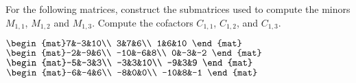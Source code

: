 
\begin{Exercise}[
name={},
title={}, 
difficulty=0,
origin={\cite{GH}}]
For the following matrices, construct the submatrices used to compute the minors $M_{1,1}$, $M_{1,2}$ and $M_{1,3}$.  Compute the cofactors $C_{1,1}$, $C_{1,2}$, and $C_{1,3}$.
\begin{multicols}{2}
\Question $\begin{mat}7&-3&10\\  3&7&6\\  1&6&10 \end{mat}$
\Question $\begin{mat}-2&-9&6\\  -10&-6&8\\  0&-3&-2 \end{mat}$
\Question $\begin{mat}-5&-3&3\\  -3&3&10\\  -9&3&9 \end{mat}$
\Question $\begin{mat}-6&-4&6\\  -8&0&0\\  -10&8&-1 \end{mat}$

\EndCurrentQuestion
\end{multicols}

\end{Exercise}
